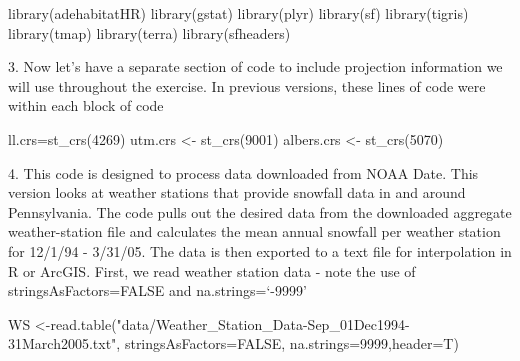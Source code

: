 \documentclass[
  letterpaper,
]{book}
\newenvironment{Shaded}{\begin{snugshade}}{\end{snugshade}}
\newcommand{\AttributeTok}[1]{\textcolor[rgb]{0.40,0.45,0.13}{#1}}
\newcommand{\ConstantTok}[1]{\textcolor[rgb]{0.56,0.35,0.01}{#1}}
\newcommand{\DecValTok}[1]{\textcolor[rgb]{0.68,0.00,0.00}{#1}}
\newcommand{\FunctionTok}[1]{\textcolor[rgb]{0.28,0.35,0.67}{#1}}
\newcommand{\NormalTok}[1]{\textcolor[rgb]{0.00,0.23,0.31}{#1}}
\newcommand{\OtherTok}[1]{\textcolor[rgb]{0.00,0.23,0.31}{#1}}
\newcommand{\StringTok}[1]{\textcolor[rgb]{0.13,0.47,0.30}{#1}}
\begin{document}
\begin{Shaded}
\begin{Highlighting}[]
\FunctionTok{library}\NormalTok{(adehabitatHR)}
\FunctionTok{library}\NormalTok{(gstat)}
\FunctionTok{library}\NormalTok{(plyr)}
\FunctionTok{library}\NormalTok{(sf)}
\FunctionTok{library}\NormalTok{(tigris)}
\FunctionTok{library}\NormalTok{(tmap)}
\FunctionTok{library}\NormalTok{(terra)}
\FunctionTok{library}\NormalTok{(sfheaders)}
\end{Highlighting}
\end{Shaded}

3. Now let's have a separate section of code to include projection
information we will use throughout the exercise. In previous versions,
these lines of code were within each block of code

\begin{Shaded}
\begin{Highlighting}[]
\NormalTok{ll.crs}\OtherTok{=}\FunctionTok{st\_crs}\NormalTok{(}\DecValTok{4269}\NormalTok{) }
\NormalTok{utm.crs }\OtherTok{\textless{}{-}} \FunctionTok{st\_crs}\NormalTok{(}\DecValTok{9001}\NormalTok{) }
\NormalTok{albers.crs }\OtherTok{\textless{}{-}} \FunctionTok{st\_crs}\NormalTok{(}\DecValTok{5070}\NormalTok{)}
\end{Highlighting}
\end{Shaded}

4. This code is designed to process data downloaded from NOAA Date. This
version looks at weather stations that provide snowfall data in and
around Pennsylvania. The code pulls out the desired data from the
downloaded aggregate weather-station file and calculates the mean annual
snowfall per weather station for 12/1/94 - 3/31/05. The data is then
exported to a text file for interpolation in R or ArcGIS. First, we read
weather station data - note the use of stringsAsFactors=FALSE and
na.strings=`-9999'

\begin{Shaded}
\begin{Highlighting}[]
\NormalTok{WS }\OtherTok{\textless{}{-}}\FunctionTok{read.table}\NormalTok{(}\StringTok{"data/Weather\_Station\_Data{-}Sep\_01Dec1994{-}31March2005.txt"}\NormalTok{, }
  \AttributeTok{stringsAsFactors=}\ConstantTok{FALSE}\NormalTok{, }\AttributeTok{na.strings=}\StringTok{\textquotesingle{}{-}9999\textquotesingle{}}\NormalTok{,}\AttributeTok{header=}\NormalTok{T)}
\end{Highlighting}
\end{Shaded}
\end{document}
